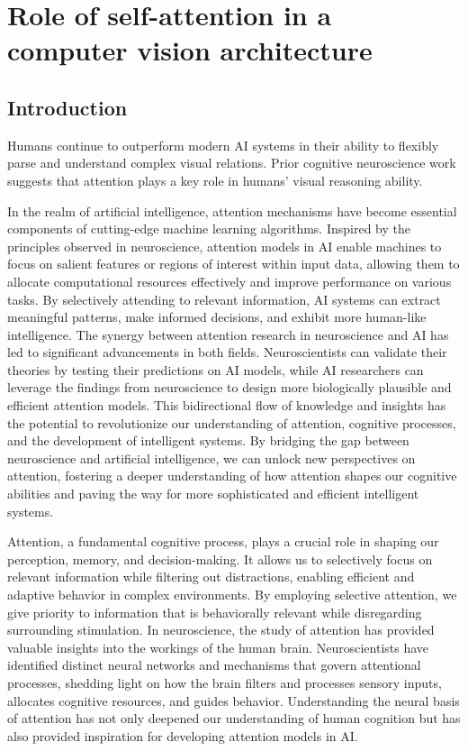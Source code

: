 \chapter{Role of self-attention in a computer vision architecture}
\label{chapter1b}

\startcontents[chapters]
\printmyminitoc

\section{Introduction}

Humans continue to outperform modern AI systems in their ability to flexibly parse and understand complex visual relations. Prior cognitive neuroscience work suggests that attention plays a key role in humans' visual reasoning ability. 

In the realm of artificial intelligence, attention mechanisms have become essential components of cutting-edge machine learning algorithms. Inspired by the principles observed in neuroscience, attention models in AI enable machines to focus on salient features or regions of interest within input data, allowing them to allocate computational resources effectively and improve performance on various tasks. By selectively attending to relevant information, AI systems can extract meaningful patterns, make informed decisions, and exhibit more human-like intelligence. The synergy between attention research in neuroscience and AI has led to significant advancements in both fields. Neuroscientists can validate their theories by testing their predictions on AI models, while AI researchers can leverage the findings from neuroscience to design more biologically plausible and efficient attention models. This bidirectional flow of knowledge and insights has the potential to revolutionize our understanding of attention, cognitive processes, and the development of intelligent systems. By bridging the gap between neuroscience and artificial intelligence, we can unlock new perspectives on attention, fostering a deeper understanding of how attention shapes our cognitive abilities and paving the way for more sophisticated and efficient intelligent systems. 

Attention, a fundamental cognitive process, plays a crucial role in shaping our perception, memory, and decision-making. It allows us to selectively focus on relevant information while filtering out distractions, enabling efficient and adaptive behavior in complex environments. By employing selective attention, we give priority to information that is behaviorally relevant while disregarding surrounding stimulation. In neuroscience, the study of attention has provided valuable insights into the workings of the human brain. Neuroscientists have identified distinct neural networks and mechanisms that govern attentional processes, shedding light on how the brain filters and processes sensory inputs, allocates cognitive resources, and guides behavior. Understanding the neural basis of attention has not only deepened our understanding of human cognition but has also provided inspiration for developing attention models in AI.

